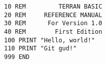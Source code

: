 \begin{lstlisting}
10 REM         TERRAN BASIC
20 REM     REFERENCE MANUAL
30 REM      For Version 1.0
40 REM        First Edition
100 PRINT "Hello, world!"
110 PRINT "Git gud!"
999 END
\end{lstlisting}
